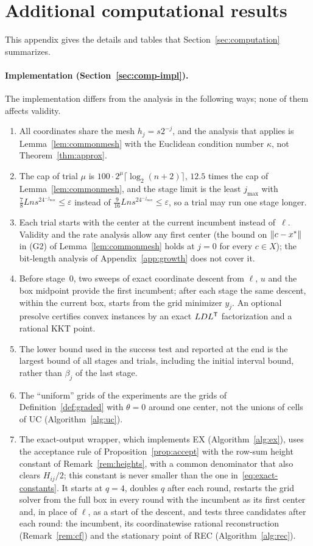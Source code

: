 \section{Additional computational results}\label{app:computation}

This appendix gives the details and tables that Section~\ref{sec:computation}
summarizes.

\paragraph{Implementation (Section~\ref{sec:comp-impl}).}
The implementation differs from the analysis in the following ways; none of
them affects validity.
\begin{enumerate}[label=(\alph*)]
\item All coordinates share the mesh $h_j=s2^{-j}$, and the analysis that
applies is Lemma~\ref{lem:commonmesh} with the Euclidean condition number
$\kappa$, not Theorem~\ref{thm:approx}.
\item The cap of trial $\mu$ is $100\cdot2^\mu\lceil\log_2(n+2)\rceil$,
$12.5$ times the cap of Lemma~\ref{lem:commonmesh}, and the stage limit is the
least $j_{\max}$ with $\frac78Lns^24^{-j_{\max}}\le\varepsilon$ instead of
$\frac9{16}Lns^24^{-j_{\max}}\le\varepsilon$, so a trial may run one stage
longer.
\item Each trial starts with the center at the current incumbent instead
of~$\ell$. Validity and the rate analysis allow any first center (the bound
on $\lVert c-x^*\rVert$ in (G2) of Lemma~\ref{lem:commonmesh} holds at $j=0$ for
every $c\in X$); the bit-length analysis of Appendix~\ref{app:growth} does
not cover it.
\item Before stage~$0$, two sweeps of exact coordinate descent from $\ell$,
$u$ and the box midpoint provide the first incumbent; after each stage the
same descent, within the current box, starts from the grid minimizer $y_j$.
An optional presolve certifies convex instances by an exact $LDL^\mathsf T$
factorization and a rational KKT point.
\item The lower bound used in the success test and reported at the end is the
largest bound of all stages and trials, including the initial interval bound,
rather than $\beta_j$ of the last stage.
\item The ``uniform'' grids of the experiments are the grids of
Definition~\ref{def:graded} with $\theta=0$ around one center, not the unions
of cells of UC (Algorithm~\ref{alg:uc}).
\item The exact-output wrapper, which implements EX (Algorithm~\ref{alg:ex}),
uses the acceptance rule of Proposition~\ref{prop:accept} with the row-sum
height constant of Remark~\ref{rem:heights}, with a common denominator that
also clears $H_{ij}/2$; this constant is never smaller than the one
in~\eqref{eq:exact-constants}. It starts at $q=4$, doubles $q$ after each
round, restarts the grid solver from the full box in every round with the
incumbent as its first center and, in place of $\ell$, as a start of the
descent, and tests three candidates after each round: the incumbent, its
coordinatewise rational reconstruction (Remark~\ref{rem:cf}) and the
stationary point of REC (Algorithm~\ref{alg:rec}).
\end{enumerate}
